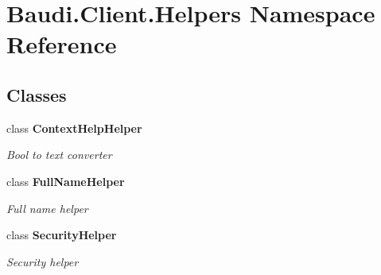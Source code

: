 \hypertarget{namespace_baudi_1_1_client_1_1_helpers}{}\section{Baudi.\+Client.\+Helpers Namespace Reference}
\label{namespace_baudi_1_1_client_1_1_helpers}
\subsection*{Classes}
\begin{DoxyCompactItemize}
\item 
class {\bfseries Context\+Help\+Helper}
\begin{DoxyCompactList}\small\item\em Bool to text converter \end{DoxyCompactList}\item 
class {\bfseries Full\+Name\+Helper}
\begin{DoxyCompactList}\small\item\em Full name helper \end{DoxyCompactList}\item 
class {\bfseries Security\+Helper}
\begin{DoxyCompactList}\small\item\em Security helper \end{DoxyCompactList}\end{DoxyCompactItemize}
